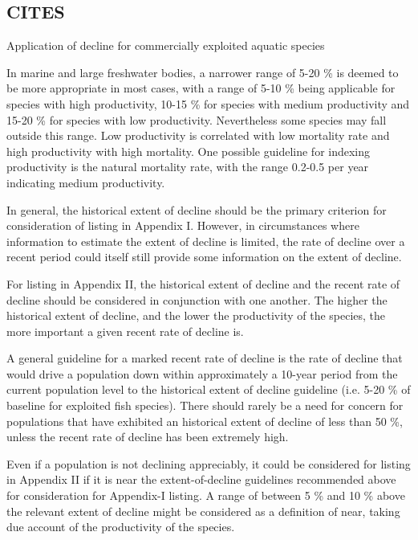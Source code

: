 \documentclass[a4paper,10pt]{article}
\begin{document}
\subsection*{CITES}

Application of decline for commercially exploited aquatic species

In marine and large freshwater bodies, a narrower range of 5-20 \% is deemed to be more appropriate in most cases, with a range of 5-10 \% being applicable for species with high productivity, 10-15 \% for species with medium productivity and 15-20 \% for species with low productivity. Nevertheless some species may fall outside this range. Low productivity is correlated with low mortality rate and high productivity with high mortality. One possible guideline for indexing productivity is the natural mortality rate, with the range 0.2-0.5 per year indicating medium productivity.

In general, the historical extent of decline should be the primary criterion for consideration of listing in Appendix I. However, in circumstances where information to estimate the extent of decline is limited, the rate of decline over a recent period could itself still provide some information on the extent of decline.

For listing in Appendix II, the historical extent of decline and the recent rate of decline should be considered in conjunction with one another. The higher the historical extent of decline, and the lower the productivity of the species, the more important a given recent rate of decline is.

A general guideline for a marked recent rate of decline is the rate of decline that would drive a population down within approximately a 10-year period from the current population level to the historical extent of decline guideline (i.e. 5-20 \% of baseline for exploited fish species). There should rarely be a need for concern for populations that have exhibited an historical extent of decline of less than 50 \%, unless the recent rate of decline has been extremely high.

Even if a population is not declining appreciably, it could be considered for listing in Appendix II if it is near the extent-of-decline guidelines recommended above for consideration for Appendix-I listing. A range of between 5 \% and 10 \% above the relevant extent of decline might be considered as a definition of near, taking due account of the productivity of the species.
\end{document}

